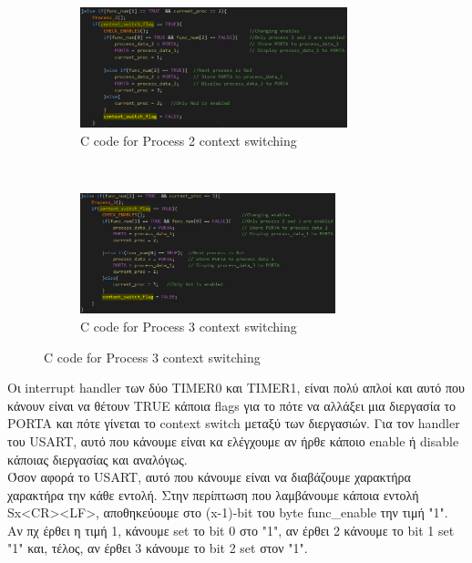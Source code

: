\documentclass{article}
\begin{document}
\begin{figure}[h!]
		\begin{subfigure}[t]{0.5\textwidth}
			\centering
			\includegraphics[height=3.5cm, width=\linewidth]{./results/lab8_main_proc_2.png}
			\caption{C code for Process 2 context switching}
		\end{subfigure}%
		~	
		\begin{subfigure}[t]{0.5\textwidth}
			\centering
			\includegraphics[height=3.5cm, width=\linewidth]{./results/lab8_main_proc_3.png}
			\caption{C code for Process 3 context switching}
		\end{subfigure}
	\end{figure}
	
	\pagebreak
	\noindent
	Οι interrupt handler των δύο TIMER0 και TIMER1, είναι πολύ απλοί και αυτό που κάνουν είναι να θέτουν TRUE κάποια flags για το πότε να αλλάξει μια διεργασία το PORTA και πότε γίνεται το context switch μεταξύ των διεργασιών. Για τον handler του USART, αυτό που κάνουμε είναι κα ελέγχουμε αν ήρθε κάποιο enable ή disable κάποιας διεργασίας και αναλόγως.\\
	
	\noindent
	Όσον αφορά το USART, αυτό που κάνουμε είναι να διαβάζουμε χαρακτήρα χαρακτήρα την κάθε εντολή. Στην περίπτωση που λαμβάνουμε κάποια εντολή Sx<CR><LF>, αποθηκεύουμε στο (x-1)-bit του byte func\_enable την τιμή "1". Αν πχ έρθει η τιμή 1, κάνουμε set το bit 0 στο "1", αν έρθει 2 κάνουμε το bit 1 set "1" και, τέλος, αν έρθει 3 κάνουμε το bit 2 set στον "1". \\
	
\end{document}
